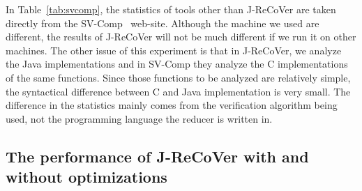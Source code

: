 \documentclass{llncs}
\begin{document}
In Table~\ref{tab:svcomp}, the statistics of tools other than J-ReCoVer are taken directly from the SV-Comp~\cite{svcomp} web-site. Although the machine we used are different, the results of J-ReCoVer will not be much different if we run it on other machines. The other issue of this experiment is that in J-ReCoVer, we analyze the Java implementations and in SV-Comp they analyze the C implementations of the same functions. Since those functions to be analyzed are relatively simple, the syntactical difference between C and Java implementation is very small. The difference in the statistics mainly comes from the verification algorithm being used, not the programming language the reducer is written in.
\begin{table}[t]
	\caption{SV-Comp 2018 results on reducer commutativity. For space reason, we only list results of competitive tool in this table, which includes top three tools in the overall ranking and the reachability safety category.}\vspace{-1cm}
	\label{tab:svcomp}
\end{table}





\subsection{The performance of J-ReCoVer with and without optimizations}
\end{document}
